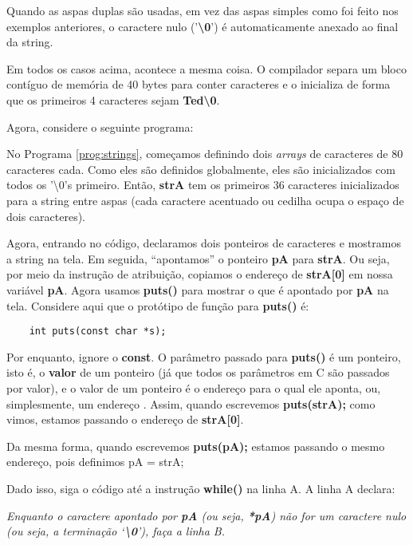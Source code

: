 Quando as aspas duplas são usadas, em vez das aspas simples como foi feito nos exemplos anteriores, o caractere nulo ('\textbf{\textbackslash0}') é automaticamente anexado ao final da string.

Em todos os casos acima, acontece a mesma coisa. O compilador separa um bloco contíguo de memória de 40 bytes para conter caracteres e o inicializa de forma que os primeiros 4 caracteres sejam \textbf{Ted\textbackslash0}.

Agora, considere o seguinte programa:


No Programa \ref{prog:strings}, começamos definindo dois \textit{arrays} de caracteres de 80 caracteres cada. Como eles são definidos globalmente, eles são inicializados com todos os '\textbackslash0's primeiro. Então, \textbf{strA} tem os primeiros 36 caracteres inicializados para a string entre aspas (cada caractere acentuado ou cedilha ocupa o espaço de dois caracteres).

Agora, entrando no código, declaramos dois ponteiros de caracteres e mostramos a string na tela. Em seguida, ``apontamos'' o ponteiro \textbf{pA} para \textbf{strA}. Ou seja, por meio da instrução de atribuição, copiamos o endereço de \textbf{strA[0]} em nossa variável \textbf{pA}. Agora usamos \textbf{puts()} para mostrar o que é apontado por \textbf{pA} na tela. Considere aqui que o protótipo de função para \textbf{puts()} é:
\begin{lstlisting}
	int puts(const char *s);
\end{lstlisting}

Por enquanto, ignore o \textbf{const}. O parâmetro passado para \textbf{puts()} é um ponteiro, isto é, o \textbf{valor} de um ponteiro (já que todos os parâmetros em C são passados por valor), e o valor de um ponteiro é o endereço para o qual ele aponta, ou, simplesmente, um endereço . Assim, quando escrevemos \textbf{puts(strA);} como vimos, estamos passando o endereço de \textbf{strA[0]}.

Da mesma forma, quando escrevemos \textbf{puts(pA);} estamos passando o mesmo endereço, pois definimos pA = strA;

Dado isso, siga o código até a instrução \textbf{while()} na linha A. A linha A declara:

\textit{Enquanto o caractere apontado por \textbf{pA} (ou seja, \textbf{*pA}) não for um caractere nulo (ou seja, a terminação `\textbf{\textbackslash0}'), faça a linha B.}

